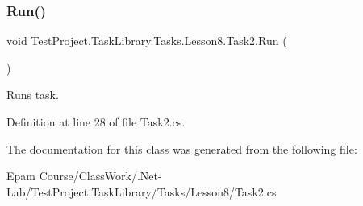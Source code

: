 \subsubsection{\texorpdfstring{Run()}{Run()}}
{\footnotesize\ttfamily void Test\+Project.\+Task\+Library.\+Tasks.\+Lesson8.\+Task2.\+Run (\begin{DoxyParamCaption}{ }\end{DoxyParamCaption})}



Runs task. 



Definition at line 28 of file Task2.\+cs.



The documentation for this class was generated from the following file\+:\begin{DoxyCompactItemize}
\item 
Epam Course/\+Class\+Work/.\+Net-\/\+Lab/\+Test\+Project.\+Task\+Library/\+Tasks/\+Lesson8/Task2.\+cs\end{DoxyCompactItemize}
